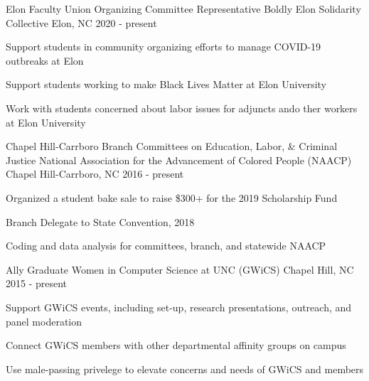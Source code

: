 

\begin{cventries}

  \cventry
    {Elon Faculty Union Organizing Committee Representative} %
    {Boldly Elon Solidarity Collective} %
    {Elon, NC} %
    {2020 - present} %
    {
      \begin{cvitems} %
        \item {Support students in community organizing efforts to manage COVID-19 outbreaks at Elon}
        \item {Support students working to make Black Lives Matter at Elon University}
        \item {Work with students concerned about labor issues for adjuncts ando ther workers  at Elon University}
      \end{cvitems}
    }

  \cventry
    {Chapel Hill-Carrboro Branch Committees on Education, Labor, \& Criminal Justice} %
    {National Association for the Advancement of Colored People (NAACP)} %
    {Chapel Hill-Carrboro, NC} %
    {2016 - present} %
    {
      \begin{cvitems} %
        \item {Organized a student bake sale to raise \$300+ for the 2019 Scholarship Fund}
        \item {Branch Delegate to State Convention, 2018}
        \item {Coding and data analysis for committees, branch, and statewide NAACP}
      \end{cvitems}
    }
   
  \cventry
    {Ally} %
    {Graduate Women in Computer Science at UNC (GWiCS)} %
    {Chapel Hill, NC} %
    {2015 - present} %
    {
      \begin{cvitems} %
        \item {Support GWiCS events, including set-up, research presentations, outreach, and panel moderation}
        \item {Connect GWiCS members with other departmental affinity groups on campus}
        \item {Use male-passing privelege to elevate concerns and needs of GWiCS and members}
      \end{cvitems}
    }
    
\end{cventries}
